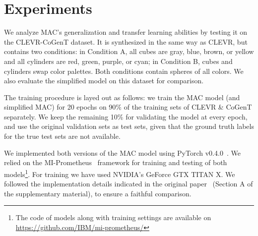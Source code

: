 \section{Experiments}

We analyze MAC's generalization and transfer learning abilities by testing it on the CLEVR-CoGenT dataset. It is synthesized in the same way as CLEVR, but contains two conditions: in Condition A, all cubes are gray, blue, brown, or yellow and all cylinders are red, green, purple, or cyan; in Condition B, cubes and cylinders swap color palettes. Both conditions contain spheres of all colors. We also evaluate the simplified model on this dataset for comparison.

The training procedure is layed out as follows: we train the MAC model (and simplified MAC) for 20 epochs on 90\% of the training sets of CLEVR \& CoGenT separately. We keep the remaining 10\% for validating the model at every epoch, and use the original validation sets as test sets, given that the ground truth labels for the true test sets are not available.

We implemented both versions of the MAC model using PyTorch v0.4.0~\cite{paszke2017automatic}. We relied on the MI-Prometheus~\cite{kornuta2018accelerating} framework for training and testing of both models\footnote{The code of models along with training settings are available on \url{https://github.com/IBM/mi-prometheus/}}. For training we have used NVIDIA's GeForce GTX TITAN X. We followed the implementation details indicated in the original paper~\cite{hudson2018compositional} (Section A of the supplementary material), to ensure a faithful comparison.

